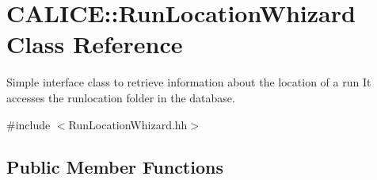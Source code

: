 \section{C\-A\-L\-I\-C\-E\-:\-:Run\-Location\-Whizard Class Reference}
\label{classCALICE_1_1RunLocationWhizard}


Simple interface class to retrieve information about the location of a run It accesses the runlocation folder in the database.  




{\ttfamily \#include $<$Run\-Location\-Whizard.\-hh$>$}

\subsection*{Public Member Functions}
